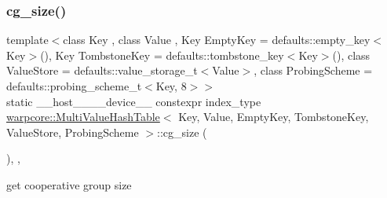 \subsubsection{\texorpdfstring{cg\+\_\+size()}{cg\_size()}}
{\footnotesize\ttfamily template$<$class Key , class Value , Key Empty\+Key = defaults\+::empty\+\_\+key$<$\+Key$>$(), Key Tombstone\+Key = defaults\+::tombstone\+\_\+key$<$\+Key$>$(), class Value\+Store  = defaults\+::value\+\_\+storage\+\_\+t$<$\+Value$>$, class Probing\+Scheme  = defaults\+::probing\+\_\+scheme\+\_\+t$<$\+Key, 8$>$$>$ \\
static \+\_\+\+\_\+host\+\_\+\+\_\+\+\_\+\+\_\+device\+\_\+\+\_\+ constexpr index\+\_\+type \hyperlink{classwarpcore_1_1MultiValueHashTable}{warpcore\+::\+Multi\+Value\+Hash\+Table}$<$ Key, Value, Empty\+Key, Tombstone\+Key, Value\+Store, Probing\+Scheme $>$\+::cg\+\_\+size (\begin{DoxyParamCaption}{ }\end{DoxyParamCaption})\hspace{0.3cm}{\ttfamily [inline]}, {\ttfamily [static]}, {\ttfamily [noexcept]}}



get cooperative group size 

